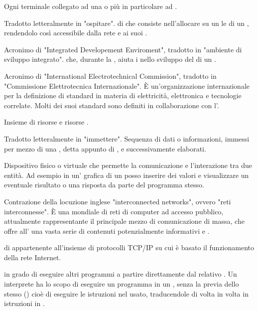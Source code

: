 {Ogni terminale collegato ad una  o più in particolare ad .}

{Tradotto letteralmente in "ospitare".  di  che consiste nell'allocare su un  le  di un , rendendolo così accessibile dalla rete  e ai suoi .}




{Acronimo di "Integrated Developement Enviroment", tradotto in "ambiente di sviluppo integrato".  che, durante la , aiuta i  nello sviluppo del  di un .}

{Acronimo di "International Electrotechnical Commission", tradotto in "Commissione Elettrotecnica Internazionale". \`{E} un'organizzazione internazionale per la definizione di standard in materia di elettricità, elettronica e tecnologie correlate. Molti dei suoi standard sono definiti in collaborazione con l'.}

{Insieme di risorse  e risorse .}

{Tradotto letteralmente in "immettere". Sequenza di dati o informazioni, immessi per mezzo di una , detta appunto di , e successivamente elaborati.}

{Dispositivo fisico o virtuale che permette la comunicazione e l'interazione tra due entità. Ad esempio in un' grafica di un  posso inserire dei valori  e visualizzare un eventuale risultato o una risposta da parte del programma stesso.}

{Contrazione della locuzione inglese "interconnected networks", ovvero "reti interconnesse".
\`{E} una  mondiale di reti di computer ad accesso pubblico, attualmente rappresentante il principale mezzo di comunicazione di massa, che offre all' una vasta serie di contenuti potenzialmente informativi e .}

{ di  appartenente all'insieme di protocolli  TCP/IP su cui è basato il funzionamento della rete Internet.}

{ in grado di eseguire altri programmi a partire direttamente dal relativo . Un interprete ha lo scopo di eseguire un programma in un , senza la previa  dello stesso () cioè di eseguire le istruzioni nel  usato, traducendole di volta in volta in istruzioni in .}


